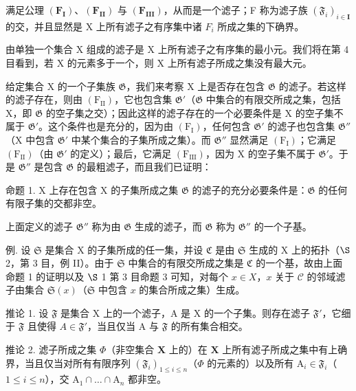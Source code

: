 满足公理 \((\mathbf{F}_{\mathbf{I}})\)、\((\mathbf{F}_{\mathbf{II}})\) 与 \((\mathbf{F}_{\mathbf{III}})\)，从而是一个滤子；F 称为滤子族 \((\mathfrak{F}_{i})_{i\in\mathbf{I}}\) 的交，并且显然是 X 上所有滤子之有序集中诸 \(F_{i}\) 所成之集的下确界。

由单独一个集合 X 组成的滤子是 X 上所有滤子之有序集的最小元。我们将在第 4 目看到，若 X 的元素多于一个，则 X 上所有滤子所成之集没有最大元。

给定集合 X 的一个子集族 \(\mathfrak{G}\)，我们来考察 X 上是否存在包含 \(\mathfrak{G}\) 的滤子。若这样的滤子存在，则由 \((\mathrm{F}_{\mathrm{II}})\)，它也包含集 \(\mathfrak{G}'\)（\(\mathfrak{G}\) 中集合的有限交所成之集，包括 X，即 \(\mathfrak{G}\) 的空子集之交）；因此这样的滤子存在的一个必要条件是 X 的空子集不属于 \(\mathfrak{G}'\)。这个条件也是充分的，因为由 \((\mathrm{F}_{\mathrm{I}})\)，任何包含 \(\mathfrak{G}'\) 的滤子也包含集 \(\mathfrak{G}''\)（X 中包含 \(\mathfrak{G}'\) 中某个集合的子集所成之集）。而 \(\mathfrak{G}''\) 显然满足 \((\mathrm{F}_{\mathrm{I}})\)；它满足 \((\mathrm{F}_{\mathrm{II}})\)（由 \(\mathfrak{G}'\) 的定义）；最后，它满足 \((\mathrm{F}_{\mathrm{III}})\)，因为 X 的空子集不属于 \(\mathfrak{G}'\)。于是 \(\mathfrak{G}''\) 是包含 \(\mathfrak{G}\) 的最粗滤子，而且我们已证明：

命题 1. X 上存在包含 X 的子集所成之集 \(\mathfrak{G}\) 的滤子的充分必要条件是：\(\mathfrak{G}\) 的任何有限子集的交都非空。

上面定义的滤子 \(\mathfrak{G}''\) 称为由 \(\mathfrak{G}\) 生成的滤子，而 \(\mathfrak{G}\) 称为 \(\mathfrak{G}''\) 的一个子基。

例. 设 \(\mathfrak{S}\) 是集合 X 的子集所成的任一集，并设 \(\mathfrak{C}\) 是由 \(\mathfrak{S}\) 生成的 X 上的拓扑（\(\S\) 2，第 3 目，例 II）。由于 \(\mathfrak{S}\) 中集合的有限交所成之集是 \(\mathfrak{C}\) 的一个基，故由上面命题 1 的证明以及 \(\S\) 1 第 3 目命题 3 可知，对每个 \(x \in X\)，\(x\) 关于 \(\mathcal{C}\) 的邻域滤子由集合 \(\mathfrak{S}(x)\)（\(\mathfrak{S}\) 中包含 \(x\) 的集合所成之集）生成。

推论 1. 设 \(\mathfrak{F}\) 是集合 X 上的一个滤子，A 是 X 的一个子集。则存在滤子 \(\mathfrak{F}'\)，它细于 \(\mathfrak{F}\) 且使得 \(A \in \mathfrak{F}'\)，当且仅当 A 与 \(\mathfrak{F}\) 的所有集合相交。

推论 2. 滤子所成之集 \(\Phi\)（非空集合 \(\mathbf{X}\) 上的）在 \(\mathbf{X}\) 上所有滤子所成之集中有上确界，当且仅当对所有有限序列 \((\mathfrak{F}_i)_{1\leqslant i\leqslant n}\)（\(\Phi\) 的元素的）以及所有 \(\mathrm{A}_i\in \mathfrak{F}_i\)（\(1\leqslant i\leqslant n\)），交 \(\mathrm{A}_1\cap \dots \cap \mathrm{A}_n\) 都非空。

